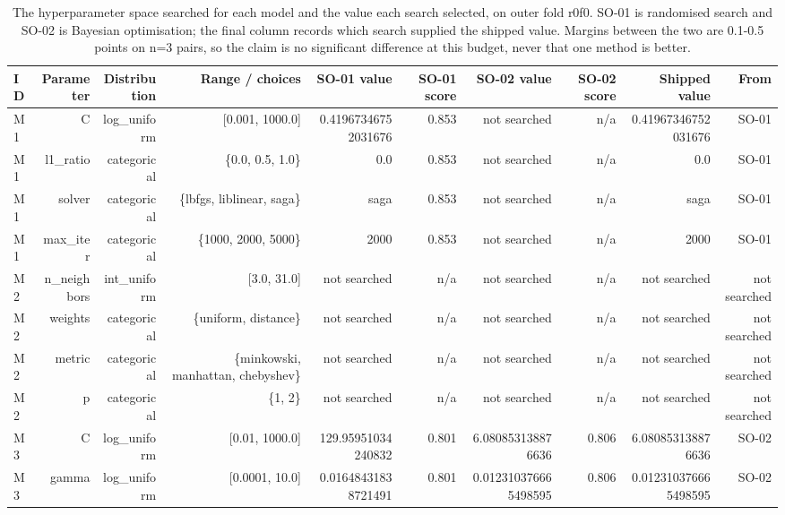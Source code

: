 \begin{table}[htbp]
  \centering
  \caption{The hyperparameter space searched for each model and the value each search selected, on outer fold r0f0. SO-01 is randomised search and SO-02 is Bayesian optimisation; the final column records which search supplied the shipped value. Margins between the two are 0.1-0.5 points on n=3 pairs, so the claim is no significant difference at this budget, never that one method is better.}
  \label{tab:t07}
  \begin{tabular}{lrrrrrrrrr}
    \toprule
    ID & Parameter & Distribution & Range / choices & SO-01 value & SO-01 score & SO-02 value & SO-02 score & Shipped value & From \\
    \midrule
    M1 & C & log\_uniform & [0.001, 1000.0] & 0.41967346752031676 & 0.853 & not searched & n/a & 0.41967346752031676 & SO-01 \\
    M1 & l1\_ratio & categorical & \{0.0, 0.5, 1.0\} & 0.0 & 0.853 & not searched & n/a & 0.0 & SO-01 \\
    M1 & solver & categorical & \{lbfgs, liblinear, saga\} & saga & 0.853 & not searched & n/a & saga & SO-01 \\
    M1 & max\_iter & categorical & \{1000, 2000, 5000\} & 2000 & 0.853 & not searched & n/a & 2000 & SO-01 \\
    M2 & n\_neighbors & int\_uniform & [3.0, 31.0] & not searched & n/a & not searched & n/a & not searched & not searched \\
    M2 & weights & categorical & \{uniform, distance\} & not searched & n/a & not searched & n/a & not searched & not searched \\
    M2 & metric & categorical & \{minkowski, manhattan, chebyshev\} & not searched & n/a & not searched & n/a & not searched & not searched \\
    M2 & p & categorical & \{1, 2\} & not searched & n/a & not searched & n/a & not searched & not searched \\
    M3 & C & log\_uniform & [0.01, 1000.0] & 129.95951034240832 & 0.801 & 6.080853138876636 & 0.806 & 6.080853138876636 & SO-02 \\
    M3 & gamma & log\_uniform & [0.0001, 10.0] & 0.01648431838721491 & 0.801 & 0.012310376665498595 & 0.806 & 0.012310376665498595 & SO-02 \\

\end{tabular}
\end{table}
